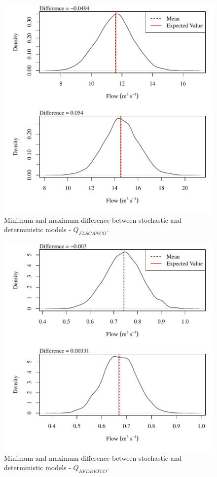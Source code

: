 \begin{center}
\begin{figure}[htbp]
	\includegraphics[width=6in]{"Figures/Results_USR/V min-max diff qFLS"}
	\caption{Minimum and maximum difference between stochastic and deterministic models - $Q_{FLSCANCO}$.}
\end{figure}
\end{center}
\newpage

\begin{center}
\begin{figure}[htbp]
	\includegraphics[width=6in]{"Figures/Results_USR/V min-max diff qRFR"}
	\caption{Minimum and maximum difference between stochastic and deterministic models - $Q_{RFDRETCO}$.}
\end{figure}
\end{center}
\newpage

